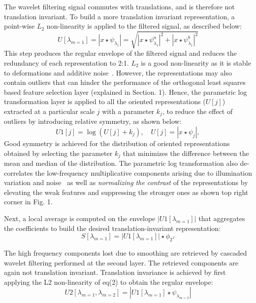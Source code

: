 \documentclass{article}
\begin{document}
The wavelet filtering signal commutes with translations, and is therefore not translation invariant. To build a more translation invariant representation, a point-wise $L_{2}$ non-linearity is applied to the filtered signal, as described below:
\vspace{-0.3em}
\begin{equation}
U[\lambda_{m = 1}] = |x\star \psi_{\lambda_{1} }| = \sqrt{|x\star \psi_{\lambda_{1} }^{a}|^2 + |x\star \psi_{\lambda_{1} }^{b}|^2} 
\end{equation}
This step produces the regular envelope of the filtered signal and reduces the redundancy of each representation to 2:1. $L_{2}$ is a good non-linearity as it is stable to deformations and additive noise~\cite{Jbruna2013}. However, the representations may also contain outliers that can hinder the performance of the orthogonal least squares based feature selection layer (explained in Section. 1). Hence, the parametric log transformation layer is applied to all the oriented representations ($U[j]$) extracted at a particular scale $j$ with a parameter $k_{j}$, to reduce the effect of outliers by introducing relative symmetry, as shown below: 
 \vspace{-0.3em}  
   \begin{equation}
  U1[j] = \log(U[j] + k_{j}), \quad U[j] = |x\star \psi_{j}|, 
\end{equation}
Good symmetry is achieved for the distribution of oriented representations obtained by selecting the parameter $k_{j}$ that minimizes the difference between the mean and median of the distribution. The parametric log transformation also de-correlates the low-frequency multiplicative components arising due to illumination variation and noise~\cite{Oyallon2015} as well as \textit{normalizing the contrast} of the representations by elevating the weak features and suppressing the stronger ones as shown top right corner in Fig. 1. 

Next, a local average is computed on the envelope $|U1[\lambda_{m = 1}]|$ that aggregates the coefficients to build the desired translation-invariant representation: 
\vspace{-0.3em}
\begin{equation}
S[\lambda_{m = 1}] = |U1[\lambda_{m = 1}]| \star \phi_{2^J}
\end{equation}

The high frequency components lost due to smoothing are retrieved by cascaded wavelet filtering performed at the second layer. The retrieved components are again not translation invariant. Translation invariance is achieved by first applying the L2 non-linearity of eq(2) to obtain the regular envelope:
\vspace{-0.3em}
\begin{equation}
U2[\lambda_{m = 1},\lambda_{m = 2}] = |U1[\lambda_{m = 1}] \star \psi_{\lambda_{m = 2}}|
\end{equation}
\end{document}
